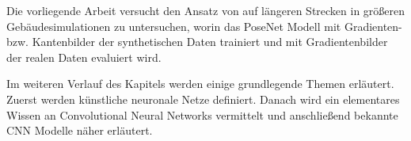 Die vorliegende Arbeit versucht den Ansatz von \citet{acharyaBIMPoseNetIndoorCamera2019} auf längeren Strecken in größeren Gebäudesimulationen zu untersuchen, worin das PoseNet Modell mit Gradienten- bzw. Kantenbilder der synthetischen Daten trainiert und mit Gradientenbilder der realen Daten evaluiert wird.

Im weiteren Verlauf des Kapitels werden einige grundlegende Themen erläutert. Zuerst werden künstliche neuronale Netze definiert. Danach wird ein elementares Wissen an Convolutional Neural Networks vermittelt und anschließend bekannte CNN Modelle näher erläutert.

